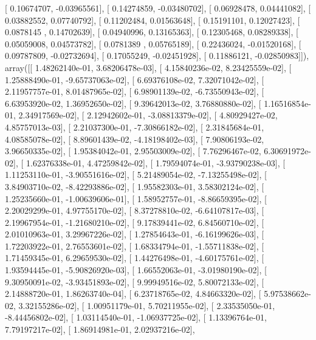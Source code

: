 \documentclass{article}
\begin{document}
       [ 0.10674707, -0.03965561],
       [ 0.14274859, -0.03480702],
       [ 0.06928478,  0.04441082],
       [ 0.03882552,  0.07740792],
       [ 0.11202484,  0.01563648],
       [ 0.15191101,  0.12027423],
       [ 0.0878145 ,  0.14702639],
       [ 0.04940996,  0.13165363],
       [ 0.12305468,  0.08289338],
       [ 0.05059008,  0.04573782],
       [ 0.0781389 ,  0.05765189],
       [ 0.22436024, -0.01520168],
       [ 0.09787809, -0.02732694],
       [ 0.17055249, -0.02451928],
       [ 0.11886121, -0.02850983]]), array([[  1.48262140e-01,   3.68206478e-03],
       [  4.15840236e-02,   8.23425559e-02],
       [  1.25888490e-01,  -9.65737063e-02],
       [  6.69376108e-02,   7.32071042e-02],
       [  2.11957757e-01,   8.01487965e-02],
       [  6.98901139e-02,  -6.73550943e-02],
       [  6.63953920e-02,   1.36952650e-02],
       [  9.39642013e-02,   3.76880880e-02],
       [  1.16516854e-01,   2.34917569e-02],
       [  2.12942602e-01,  -3.08813379e-02],
       [  4.80929427e-02,   4.85757013e-03],
       [  2.21037300e-01,  -7.30866182e-02],
       [  2.31845684e-01,   4.08585078e-02],
       [  8.89601439e-02,  -4.18198402e-03],
       [  7.90806193e-02,   3.96650335e-02],
       [  1.95384042e-01,   2.95503009e-02],
       [  7.76296467e-02,   6.30691972e-02],
       [  1.62376338e-01,   4.47259842e-02],
       [  1.79594074e-01,  -3.93790238e-03],
       [  1.11253110e-01,  -3.90551616e-02],
       [  5.21489054e-02,  -7.13255498e-02],
       [  3.84903710e-02,  -8.42293886e-02],
       [  1.95582303e-01,   3.58302124e-02],
       [  1.25235660e-01,  -1.00639606e-01],
       [  1.58952757e-01,  -8.86659395e-02],
       [  2.20029299e-01,   4.97755170e-02],
       [  8.37278810e-02,  -6.64107817e-03],
       [  2.19967954e-01,  -1.21680210e-02],
       [  9.17839441e-02,   6.84560710e-02],
       [  2.01010963e-01,   3.29967226e-02],
       [  1.27854643e-01,  -6.16199626e-03],
       [  1.72203922e-01,   2.76553601e-02],
       [  1.68334794e-01,  -1.55711838e-02],
       [  1.71459345e-01,   6.29659530e-02],
       [  1.44276498e-01,  -4.60175761e-02],
       [  1.93594445e-01,  -5.90826920e-03],
       [  1.66552063e-01,  -3.01980190e-02],
       [  9.30950091e-02,  -3.93451893e-02],
       [  9.99949516e-02,   5.80072133e-02],
       [  2.14888720e-01,   1.86263740e-04],
       [  6.23718765e-02,   4.84663320e-02],
       [  5.97538662e-02,   3.32155286e-02],
       [  1.00951179e-01,   5.70211955e-02],
       [  2.33535050e-01,  -8.44456802e-02],
       [  1.03114540e-01,  -1.06937725e-02],
       [  1.13396764e-01,   7.79197217e-02],
       [  1.86914981e-01,   2.02937216e-02],
\end{document}
